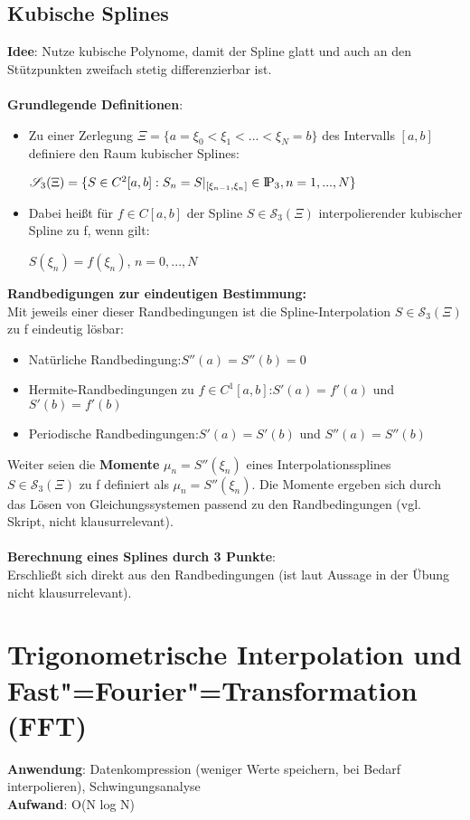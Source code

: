 \documentclass[10pt,a4paper]{article}
\def\polynomials{{\rm I\!P}}
\begin{document}
	\subsection{Kubische Splines}
	\textbf{Idee}: Nutze kubische Polynome, damit der Spline glatt und auch an den Stützpunkten zweifach stetig differenzierbar ist.\\\\
	\textbf{Grundlegende Definitionen}:\\
	\begin{itemize}
		\item Zu einer Zerlegung $\Xi = \{a = \xi_0 < \xi_1 < ... < \xi_N = b\}$ des Intervalls $[a, b]$ definiere den Raum kubischer Splines:
		\begin{center}
			$\mathscr{S}_3(\Xi) = \{S \in C^2[a, b]: S_n = S|_{[\xi_{n-1}, \xi_n]} \in \polynomials_3, n = 1, ..., N\}$
		\end{center}
		\item Dabei heißt für $f \in C[a, b]$ der Spline $S \in \mathscr{S}_3(\Xi)$ interpolierender kubischer Spline zu f, wenn gilt:
		\begin{center}
			$S(\xi_n) = f(\xi_n)$, $n = 0, ..., N$
		\end{center}
	\end{itemize}
	\textbf{Randbedigungen zur eindeutigen Bestimmung:}\\
	Mit jeweils einer dieser Randbedingungen ist die Spline-Interpolation $S \in \mathscr{S}_3(\Xi)$ zu f eindeutig lösbar:
	\begin{itemize}
		\item Natürliche Randbedingung:\hfill$S''(a) = S''(b) = 0$
		\item Hermite-Randbedingungen zu $f \in C^1[a, b]$:\hfill$S'(a) = f'(a)$ und $S'(b) = f'(b)$
		\item Periodische Randbedingungen:\hfill$S'(a) = S'(b)$ und $S''(a) = S''(b)$
	\end{itemize}
	Weiter seien die \textbf{Momente} $\mu_n = S''(\xi_n)$ eines Interpolationssplines $S \in \mathscr{S}_3(\Xi)$ zu f definiert als $\mu_n = S''(\xi_n)$. Die Momente ergeben sich durch das Lösen von Gleichungssystemen passend zu den Randbedingungen (vgl. Skript, nicht klausurrelevant).\\\\
	\textbf{Berechnung eines Splines durch 3 Punkte}:\\
	Erschließt sich direkt aus den Randbedingungen (ist laut Aussage in der Übung nicht klausurrelevant).
	\newpage
	\section{Trigonometrische Interpolation und Fast"=Fourier"=Transformation (FFT)}
	\textbf{Anwendung}: Datenkompression (weniger Werte speichern, bei Bedarf interpolieren), Schwingungsanalyse\\
	\textbf{Aufwand}: O(N log N)
	
\end{document}
